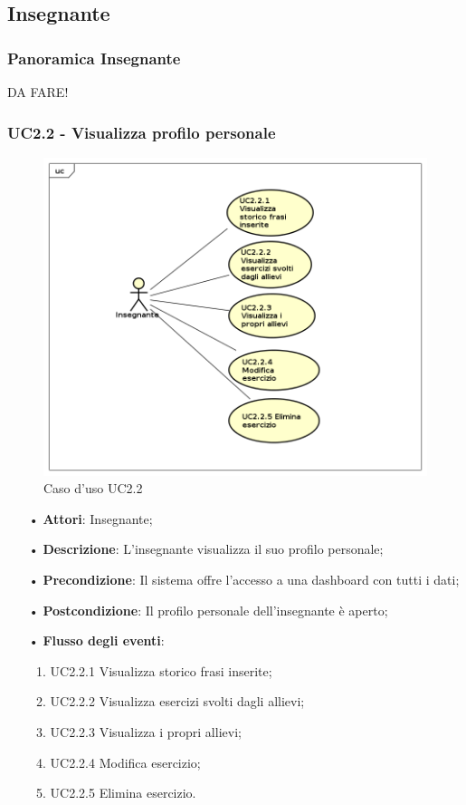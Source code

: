 
\subsection{Insegnante}
\subsubsection{Panoramica Insegnante}
DA FARE!

\subsubsection{UC2.2 - Visualizza profilo personale}

\begin{figure}[H]
\centering
\includegraphics[width=14cm]{img/UC22.png} 
\caption{Caso d'uso UC2.2}
\end{figure}

\begin{itemize}
	\item[•] \textbf{Attori}: Insegnante;
	\item[•] \textbf{Descrizione}: L’insegnante visualizza il suo profilo personale;

	\item[•] \textbf{Precondizione}: Il sistema offre l’accesso a una dashboard con tutti i dati;

	\item[•] \textbf{Postcondizione}:  Il profilo personale dell’insegnante è aperto;
	\item[•] \textbf{Flusso degli eventi}:
		\begin{enumerate}
			\item UC2.2.1 Visualizza storico frasi inserite;
			\item UC2.2.2 Visualizza esercizi svolti dagli allievi;
			\item UC2.2.3 Visualizza i propri allievi;
			\item UC2.2.4 Modifica esercizio;
			\item UC2.2.5 Elimina esercizio.
		\end{enumerate}
\end{itemize}

